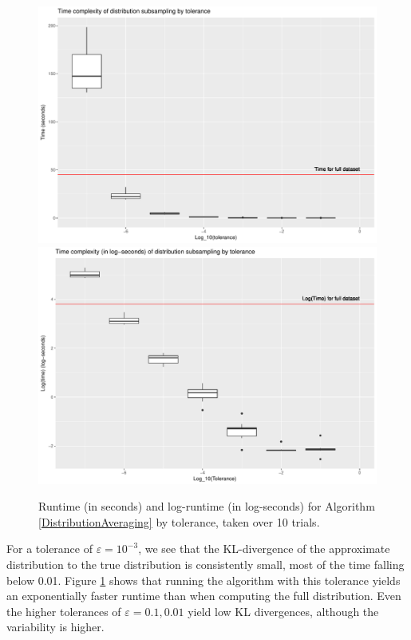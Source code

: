 \documentclass{article}
\begin{document}
\begin{figure}
    \includegraphics[width=0.9\linewidth]{Figures/PairwiseDistance/time_by_tol.pdf}
    \includegraphics[width=0.9\linewidth]{Figures/PairwiseDistance/log_time_by_tol.pdf}
    \caption{Runtime (in seconds) and log-runtime (in log-seconds) for Algorithm \ref{DistributionAveraging} by tolerance, taken over 10 trials.}
    \label{fig:Times}
\end{figure}


For a tolerance of $\varepsilon = 10^{-3}$, we see that the KL-divergence of the approximate distribution to the true distribution is consistently small, most of the time falling below 0.01. 
Figure \ref{fig:Times} shows that running the algorithm with this tolerance yields an exponentially faster runtime than when computing the full distribution.  
Even the higher tolerances of $\varepsilon = 0.1, 0.01$ yield low KL divergences, although the variability is higher.
\end{document}
